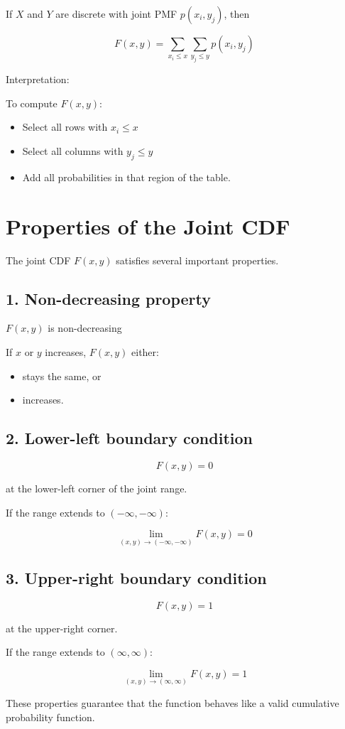 \documentclass[12pt]{article}
\begin{document}
If $X$ and $Y$ are discrete with joint PMF $p(x_i,y_j)$, then

\[
F(x,y)=\sum_{x_i \le x}\sum_{y_j \le y} p(x_i,y_j)
\]

Interpretation:

To compute $F(x,y)$:

\begin{itemize}
\item Select all rows with $x_i \le x$
\item Select all columns with $y_j \le y$
\item Add all probabilities in that region of the table.
\end{itemize}

\section{Properties of the Joint CDF}

The joint CDF $F(x,y)$ satisfies several important properties.

\subsection*{1. Non-decreasing property}

$F(x,y)$ is non-decreasing

If $x$ or $y$ increases, $F(x,y)$ either:

\begin{itemize}
\item stays the same, or
\item increases.
\end{itemize}

\subsection*{2. Lower-left boundary condition}

\[
F(x,y)=0
\]

at the lower-left corner of the joint range.

If the range extends to $(-\infty,-\infty)$:

\[
\lim_{(x,y)\to(-\infty,-\infty)}F(x,y)=0
\]

\subsection*{3. Upper-right boundary condition}

\[
F(x,y)=1
\]

at the upper-right corner.

If the range extends to $(\infty,\infty)$:

\[
\lim_{(x,y)\to(\infty,\infty)}F(x,y)=1
\]

These properties guarantee that the function behaves like a valid cumulative probability function.
\end{document}

